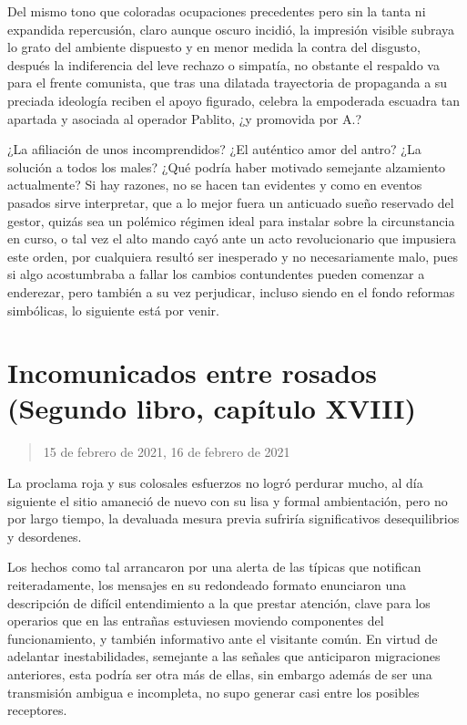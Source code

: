 \documentclass[
]{book}
\begin{document}
Del mismo tono que coloradas ocupaciones precedentes pero sin la tanta ni expandida repercusión, claro aunque oscuro incidió, la impresión visible subraya lo grato del ambiente dispuesto y en menor medida la contra del disgusto, después la indiferencia del leve rechazo o simpatía, no obstante el respaldo va para el frente comunista, que tras una dilatada trayectoria de propaganda a su preciada ideología reciben el apoyo figurado, celebra la empoderada escuadra tan apartada y asociada al operador Pablito, ¿y promovida por A.?

¿La afiliación de unos incomprendidos? ¿El auténtico amor del antro? ¿La solución a todos los males? ¿Qué podría haber motivado semejante alzamiento actualmente? Si hay razones, no se hacen tan evidentes y como en eventos pasados sirve interpretar, que a lo mejor fuera un anticuado sueño reservado del gestor, quizás sea un polémico régimen ideal para instalar sobre la circunstancia en curso, o tal vez el alto mando cayó ante un acto revolucionario que impusiera este orden, por cualquiera resultó ser inesperado y no necesariamente malo, pues si algo acostumbraba a fallar los cambios contundentes pueden comenzar a enderezar, pero también a su vez perjudicar, incluso siendo en el fondo reformas simbólicas, lo siguiente está por venir.

\hypertarget{incomunicados-entre-rosados-segundo-libro-capuxedtulo-xviii}{%
\section{Incomunicados entre rosados (Segundo libro, capítulo XVIII)}\label{incomunicados-entre-rosados-segundo-libro-capuxedtulo-xviii}}

\begin{quote}
15 de febrero de 2021, 16 de febrero de 2021
\end{quote}

La proclama roja y sus colosales esfuerzos no logró perdurar mucho, al día siguiente el sitio amaneció de nuevo con su lisa y formal ambientación, pero no por largo tiempo, la devaluada mesura previa sufriría significativos desequilibrios y desordenes.

Los hechos como tal arrancaron por una alerta de las típicas que notifican reiteradamente, los mensajes en su redondeado formato enunciaron una descripción de difícil entendimiento a la que prestar atención, clave para los operarios que en las entrañas estuviesen moviendo componentes del funcionamiento, y también informativo ante el visitante común. En virtud de adelantar inestabilidades, semejante a las señales que anticiparon migraciones anteriores, esta podría ser otra más de ellas, sin embargo además de ser una transmisión ambigua e incompleta, no supo generar casi entre los posibles receptores.
\end{document}
